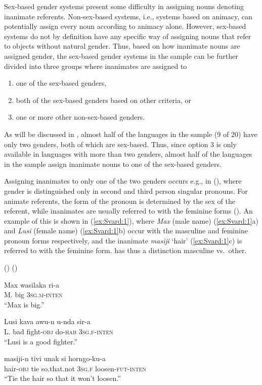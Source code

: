 \documentclass[output=collectionpaper]{langsci/langscibook}
\begin{document}
Sex-based gender systems present some difficulty in assigning nouns denoting inanimate referents. Non-sex-based systems, i.e., systems based on animacy, can potentially assign every noun according to animacy alone. However, sex-based systems do not by definition have any specific way of assigning nouns that refer to objects without natural gender. Thus, based on how inanimate nouns are assigned gender, the sex-based gender systems in the sample can be further divided into three groups where inanimates are assigned to

\begin{enumerate}
\item one of the sex-based genders,
\item both of the sex-based genders based on other criteria, or
\item one or more other non-sex-based genders.
\end{enumerate}


As will be discussed in , almost half of the languages in the sample (9 of 20) have only two genders, both of which are sex-based. Thus, since option 3 is only available in languages with more than two genders, almost half of the languages in the sample assign inanimate nouns to one of the sex-based genders.

Assigning inanimates to only one of the two genders occurs e.g., in  (), where gender is distinguished only in second and third person singular pronouns. For animate referents, the form of the pronoun is determined by the sex of the referent, while inanimates are usually referred to with the feminine forms (\citealt[17]{Hoel1994}). An example of this is shown in (\ref{ex:Svard:1}), where \textit{Max} (male name) (\ref{ex:Svard:1}a) and \textit{Lusi} (female name) (\ref{ex:Svard:1}b) occur with the masculine and feminine pronoun forms respectively, and the inanimate \textit{masiji} `hair' (\ref{ex:Svard:1}c) is referred to with the feminine form.  has thus a distinction masculine vs.\ other.

\ea
\label{ex:Svard:1}
 () (\citealt[19, 31, 46]{Hoel1994})\\
\begin{xlist}
\ex
\gll Max wasilaka ri-a\\
     M. big 3\textsc{sg.m-inten}\\
\glt ``Max is big.''

\ex
\gll Lusi kava awu-n u-nda sir-a\\
     L. {bad\footnotemark} fight\textsc{{}-obj} do\textsc{{}-hab} \textsc{3sg.f-inten}\\
\glt ``Lusi is a good fighter.''

\ex
\gll masiji-n tivi unak si horngo-ku-a\\
     hair-\textsc{obj} tie so.that.not 3\textsc{sg.f} loosen-\textsc{fut-inten}\\
\glt ``Tie the hair so that it won't loosen.''
\end{xlist}
\z
{}
\end{document}
